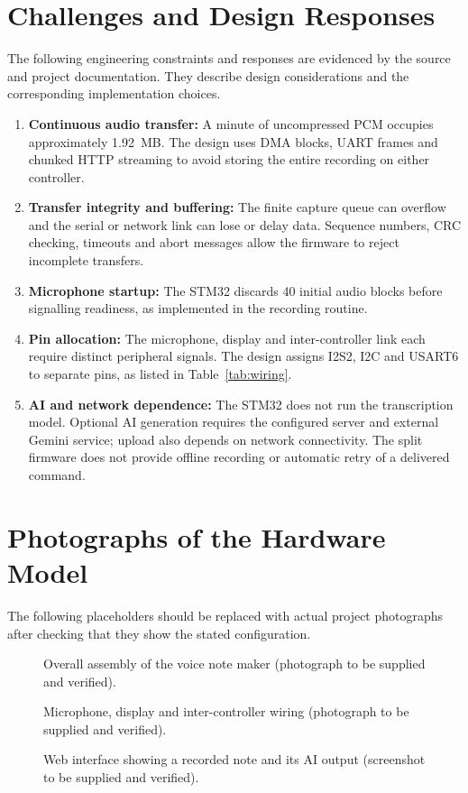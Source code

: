 \section{Challenges and Design Responses}
The following engineering constraints and responses are evidenced by the source and project documentation. They describe design considerations and the corresponding implementation choices.
\begin{enumerate}
\item \textbf{Continuous audio transfer:} A minute of uncompressed PCM occupies approximately 1.92~MB. The design uses DMA blocks, UART frames and chunked HTTP streaming to avoid storing the entire recording on either controller.
\item \textbf{Transfer integrity and buffering:} The finite capture queue can overflow and the serial or network link can lose or delay data. Sequence numbers, CRC checking, timeouts and abort messages allow the firmware to reject incomplete transfers.
\item \textbf{Microphone startup:} The STM32 discards 40 initial audio blocks before signalling readiness, as implemented in the recording routine.
\item \textbf{Pin allocation:} The microphone, display and inter-controller link each require distinct peripheral signals. The design assigns I2S2, I2C and USART6 to separate pins, as listed in Table~\ref{tab:wiring}.
\item \textbf{AI and network dependence:} The STM32 does not run the transcription model. Optional AI generation requires the configured server and external Gemini service; upload also depends on network connectivity. The split firmware does not provide offline recording or automatic retry of a delivered command.
\end{enumerate}

\section{Photographs of the Hardware Model}
The following placeholders should be replaced with actual project photographs after checking that they show the stated configuration.
\begin{figure}[htbp]
\centering
{}
\caption{Overall assembly of the voice note maker (photograph to be supplied and verified).}
\label{fig:assembly-photo}
\end{figure}
\begin{figure}[htbp]
\centering
{}
\caption{Microphone, display and inter-controller wiring (photograph to be supplied and verified).}
\label{fig:wiring-photo}
\end{figure}
\begin{figure}[htbp]
\centering
{}
\caption{Web interface showing a recorded note and its AI output (screenshot to be supplied and verified).}
\label{fig:web-photo}
\end{figure}


